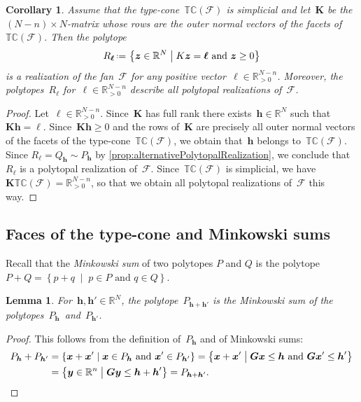 \documentclass{amsart}
\newtheorem{corollary}[theorem]{Corollary}
\newtheorem{lemma}[theorem]{Lemma}
\theoremstyle{definition}
\newcommand{\R}{\mathbb{R}} %
\renewcommand{\b}[1]{{\boldsymbol{#1}}} %
\newcommand{\set}[2]{\left\{ #1 \;\middle|\; #2 \right\}} %
\newcommand{\eqdef}{\mbox{\,\raisebox{0.2ex}{\scriptsize\ensuremath{\mathrm:}}\ensuremath{=}\,}} %
\newcommand{\darkblue}{\color{darkblue}} %
\newcommand{\defn}[1]{\textsl{\darkblue #1}} %
\newcommand{\Fan}{\mathcal{F}} %
\newcommand{\typeCone}{\mathbb{TC}} %
\begin{document}
\begin{corollary}
\label{coro:simplicialTypeCone}
Assume that the type-cone~$\typeCone(\Fan)$ is simplicial and let~$\b{K}$ be the $(N-n) \times N$-matrix whose rows are the outer normal vectors of the facets of~$\typeCone(\Fan)$. Then the polytope
\[
R_\b{\ell} \eqdef \set{\b{z} \in \R^N}{K\b{z} = \b{\ell} \text{ and } \b{z} \ge 0}
\]
is a realization of the fan~$\Fan$ for any positive vector~$\b{\ell} \in \R_{>0}^{N-n}$.
Moreover, the polytopes~$R_\b{\ell}$ for~$\b{\ell} \in \R_{>0}^{N-n}$ describe all polytopal realizations of~$\Fan$.
\end{corollary}

\begin{proof}
Let~$\b{\ell} \in \R_{>0}^{N-n}$.
Since~$\b{K}$ has full rank there exists~$\b{h} \in \R^N$ such that~$\b{K}\b{h} = \b{\ell}$.
Since~$\b{K}\b{h} \ge 0$ and the rows of~$\b{K}$ are precisely all outer normal vectors of the facets of the type-cone~$\typeCone(\Fan)$, we obtain that~$\b{h}$ belongs to~$\typeCone(\Fan)$.
Since $R_\b{\ell} = Q_\b{h} \sim P_\b{h}$ by \cref{prop:alternativePolytopalRealization}, we conclude that~$R_\b{\ell}$ is a polytopal realization of~$\Fan$.
Since~$\typeCone(\Fan)$ is simplicial, we have~$\b{K}\typeCone(\Fan) = \R_{>0}^{N-n}$, so that we obtain all polytopal realizations of~$\Fan$ this way.
\end{proof}


\subsection{Faces of the type-cone and Minkowski sums}
Recall that the \defn{Minkowski sum} of two polytopes $P$ and $Q$ is the polytope $P+Q=\set{p+q}{p\in P\text{ and } q\in Q}$. 

\begin{lemma}
\label{lem:MinkowskiSum}
For~$\b{h}, \b{h}' \! \in \R^N$, the polytope~$P_{\b{h} + \b{h'}}$ is the Minkowski sum of the polytopes~$P_\b{h}$~and~$P_{\b{h}'}$.
\end{lemma}

\begin{proof}
This follows from the definition of~$P_\b{h}$ and of Minkowski sums:
\begin{align*}
P_\b{h} + P_{\b{h}'} & = \set{\b{x} + \b{x}'}{\b{x} \in P_\b{h} \text{ and } \b{x}' \in P_{\b{h}'}} = \set{\b{x} + \b{x}'}{\b{G}\b{x} \le \b{h} \text{ and } \b{G}\b{x}' \le \b{h}'} \\
& = \set{\b{y} \in \R^n}{\b{G}\b{y} \le \b{h} + \b{h}'} = P_{\b{h} + \b{h}'}.
\qedhere
\end{align*}
\end{proof}
\end{document}
